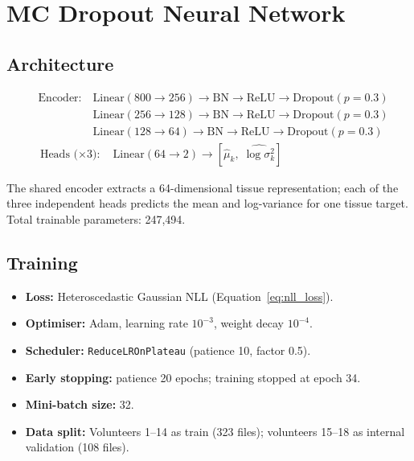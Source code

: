 \documentclass[12pt, a4paper, oneside]{report}
\begin{document}
\section{MC Dropout Neural Network}

\subsection{Architecture}

\begin{equation}
\begin{aligned}
  &\text{Encoder:} \quad \mathrm{Linear}(800\to 256) \to \mathrm{BN} \to \mathrm{ReLU} \to \mathrm{Dropout}(p{=}0.3) \\
  &\phantom{\text{Encoder:}} \quad \mathrm{Linear}(256\to 128) \to \mathrm{BN} \to \mathrm{ReLU} \to \mathrm{Dropout}(p{=}0.3) \\
  &\phantom{\text{Encoder:}} \quad \mathrm{Linear}(128\to 64) \to \mathrm{BN} \to \mathrm{ReLU} \to \mathrm{Dropout}(p{=}0.3) \\
  &\text{Heads ($\times$3):} \quad \mathrm{Linear}(64 \to 2) \to [\hat\mu_k,\; \widehat{\log\sigma^2_k}]
\end{aligned}
\end{equation}

The shared encoder extracts a 64-dimensional tissue representation; each of the three independent heads predicts the mean and log-variance for one tissue target. Total trainable parameters: 247,494.

\subsection{Training}

\begin{itemize}[noitemsep]
  \item \textbf{Loss:} Heteroscedastic Gaussian NLL (Equation~\ref{eq:nll_loss}).
  \item \textbf{Optimiser:} Adam, learning rate $10^{-3}$, weight decay $10^{-4}$.
  \item \textbf{Scheduler:} \texttt{ReduceLROnPlateau} (patience 10, factor 0.5).
  \item \textbf{Early stopping:} patience 20 epochs; training stopped at epoch 34.
  \item \textbf{Mini-batch size:} 32.
  \item \textbf{Data split:} Volunteers 1--14 as train (323 files); volunteers 15--18 as internal validation (108 files).
\end{itemize}
\end{document}
